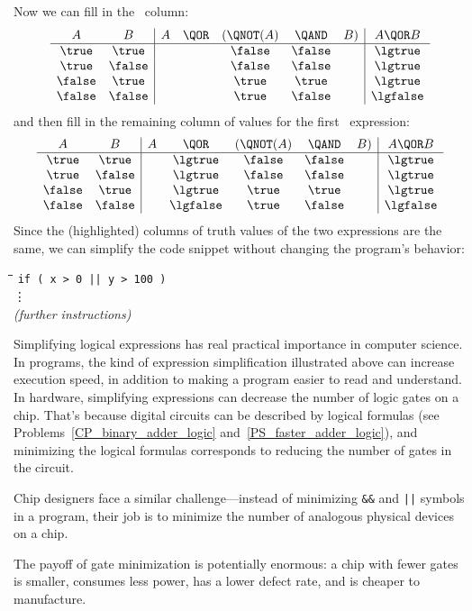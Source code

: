 Now we can fill in the \QAND\ column:
\[
\begin{array}{cc|ccccc|c}
A      & B      & A & \QOR  & (\QNOT(A) & \QAND   & B) & A \QOR  B \\ \hline
\true  & \true  &   &       &  \false   &  \false &    & \lgtrue \\
\true  & \false &   &       &  \false   &  \false &    & \lgtrue \\
\false & \true  &   &       &  \true    &  \true  &    & \lgtrue \\
\false & \false &   &       &  \true    &  \false &    & \lgfalse\\
\end{array}
\]
and then fill in the remaining column of values for the first \QOR\
expression:
\[
\begin{array}{cc|ccccc|c}
A      & B      & A & \QOR     &(\QNOT(A) & \QAND   & B) & A \QOR  B \\ \hline
\true  & \true  &   & \lgtrue  & \false &    \false &    & \lgtrue \\
\true  & \false &   & \lgtrue  & \false &    \false &    & \lgtrue \\
\false & \true  &   & \lgtrue  & \true  &    \true  &    & \lgtrue \\
\false & \false &   & \lgfalse & \true  &    \false &    & \lgfalse\\
\end{array}
\]
Since the (highlighted) columns of truth values of the two expressions are
the same, we can simplify the code snippet without changing the program's
behavior:
%
\begin{tabbing}
\hspace{1in} \= \quad\quad \= \quad\quad \= \quad\quad \= \kill
\> \texttt{if ( x > 0 || y > 100 )} \\
\> \> \vdots\\
\> \emph{(further instructions)}
\end{tabbing}

 Simplifying logical expressions has real practical
importance in computer science.  In programs, the kind of expression
simplification illustrated above can increase execution speed, in addition
to making a program easier to read and understand.  In hardware,
simplifying expressions can decrease the number of logic gates on a chip.
That's because digital circuits can be described by logical formulas (see
Problems~\ref{CP_binary_adder_logic} and~\ref{PS_faster_adder_logic}), and
minimizing the logical formulas corresponds to reducing the number of
gates in the circuit.
\begin{editingnotes}
   Chip designers face a similar challenge---instead of
  minimizing \texttt{\&\&} and \texttt{||} symbols in a program, their job
  is to minimize the number of analogous physical devices on a chip.
\end{editingnotes}
The payoff of gate minimization is potentially enormous: a chip with
fewer gates is smaller, consumes less power, has a lower defect rate,
and is cheaper to manufacture.

